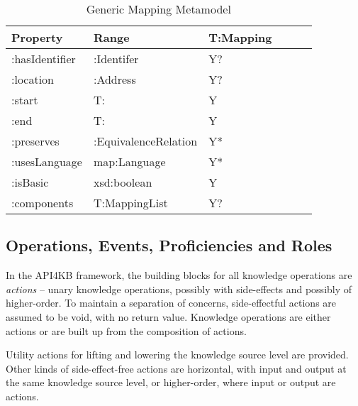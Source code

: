 \documentclass[runningheads]{llncs}
\begin{document}
\begin{table}[h]
\centering
\begin{tabular}{|l|l|l|l|l|l|}
 \hline
\textbf{Property} & \textbf{Range} & \textbf{T:Mapping}   \\ \hline
:hasIdentifier    & :Identifer     &  Y?                       \\ \hline
:location         & :Address       &  Y?                       \\ \hline
:start          & T:               &  Y                       \\ \hline
:end            & T:               &  Y                       \\ \hline
:preserves        & :EquivalenceRelation    &  Y*              \\ \hline
:usesLanguage     & map:Language    &  Y*              \\ \hline
:isBasic         & xsd:boolean     &  Y              \\ \hline
:components      & T:MappingList     &  Y?              \\ \hline
\end{tabular}
\caption{Generic Mapping Metamodel}
\label{krmaponto}
\end{table}


\subsection{Operations, Events, Proficiencies and Roles}
\label{sec:op}

In the API4KB framework, the building blocks for all knowledge operations are \emph{actions} -- unary knowledge operations, possibly with side-effects and possibly of higher-order. To maintain a separation of concerns, side-effectful actions are assumed to be void, with no return value. Knowledge operations are either actions or are built up from the composition of actions. 

Utility actions for lifting and lowering the knowledge source level are provided. Other kinds of side-effect-free actions are horizontal, with input and output at the same knowledge source level, or higher-order, where input or output are actions.
\end{document}
